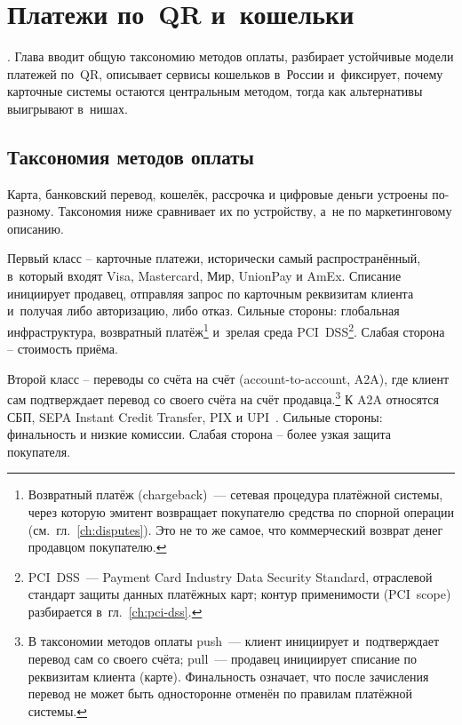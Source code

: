 
\chapter{Платежи по~QR и~кошельки}\label{ch:qr-wallets}
. Глава вводит общую таксономию методов оплаты, разбирает
устойчивые модели платежей по~QR, описывает сервисы кошельков
в~России и~фиксирует, почему карточные системы остаются центральным
методом, тогда как альтернативы выигрывают в~нишах.

\section{Таксономия методов оплаты}\label{sec:payment-methods-taxonomy}

Карта, банковский перевод, кошелёк, рассрочка и цифровые деньги
устроены по-разному. Таксономия ниже сравнивает их по устройству,
а~не по маркетинговому описанию.

Первый класс -- карточные платежи, исторически самый
распространённый, в~который входят Visa, Mastercard, Мир, UnionPay
и AmEx. Списание инициирует продавец, отправляя
запрос по карточным реквизитам клиента и~получая либо авторизацию,
либо отказ. Сильные стороны: глобальная инфраструктура, возвратный
платёж\footnote{Возвратный платёж (chargeback)~--- сетевая процедура
платёжной системы, через которую эмитент возвращает покупателю
средства по спорной операции (см.~гл.~\ref{ch:disputes}). Это
не то же самое, что коммерческий возврат денег продавцом
покупателю.} и~зрелая среда PCI~DSS\footnote{PCI~DSS~--- Payment Card
Industry Data Security Standard, отраслевой стандарт защиты данных
платёжных карт; контур применимости (PCI~scope) разбирается
в~гл.~\ref{ch:pci-dss}.}. Слабая сторона -- стоимость приёма.

Второй класс -- переводы со счёта на счёт (account-to-account, A2A),
где клиент сам подтверждает перевод со своего счёта на счёт
продавца.\footnote{В таксономии методов оплаты push~--- клиент
инициирует и~подтверждает перевод сам со своего счёта;
pull~--- продавец инициирует списание по реквизитам клиента
(карте). Финальность означает, что после зачисления перевод
не может быть односторонне отменён по правилам платёжной системы.}
К A2A относятся СБП, SEPA Instant Credit Transfer, PIX и UPI~\cite{sbp-main,sepa-instant,pix,upi}.
Сильные стороны: финальность и низкие комиссии. Слабая сторона -- более
узкая защита покупателя.

